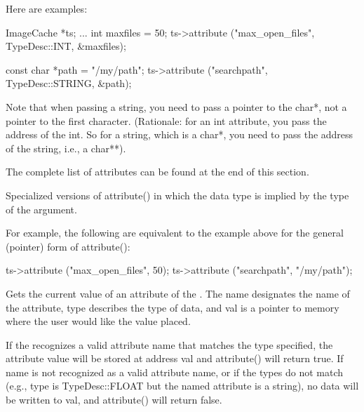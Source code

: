 Here are examples:

\begin{code}
      ImageCache *ts; 
      ...
      int maxfiles = 50;
      ts->attribute ("max_open_files", TypeDesc::INT, &maxfiles);

      const char *path = "/my/path";
      ts->attribute ("searchpath", TypeDesc::STRING, &path);
\end{code}

Note that when passing a string, you need to pass a pointer to the {\cf
  char*}, not a pointer to the first character.  (Rationale: for an {\cf
  int} attribute, you pass the address of the {\cf int}.  So for a
string, which is a {\cf char*}, you need to pass the address of the
string, i.e., a {\cf char**}).

The complete list of attributes can be found at the end of this section.

\apiend

Specialized versions of {\cf attribute()} in which the data type is
implied by the type of the argument.

For example, the following are equivalent to the example above for the
general (pointer) form of {\cf attribute()}:

\begin{code}
      ts->attribute ("max_open_files", 50);
      ts->attribute ("searchpath", "/my/path");
\end{code}

\apiend



Gets the current value of an attribute of the \ImageCache.
The {\cf name} designates the name of the attribute, {\cf type}
describes the type of data, and {\cf val} is a pointer to memory 
where the user would like the value placed.

If the \ImageCache recognizes a valid attribute name that matches the
type specified, the attribute value will be stored at address {\cf val}
and {\cf attribute()} will return {\cf true}.  If {\cf name} is not recognized
as a valid attribute name, or if the types do not match (e.g., {\cf
  type} is {\cf TypeDesc::FLOAT} but the named attribute is a string),
no data will be written to {\cf val}, and {\cf attribute()} will return
{\cf false}.

